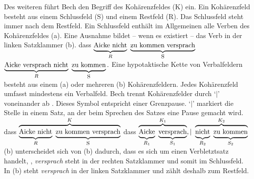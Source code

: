 Des weiteren führt Bech den Begriff des Kohärenzfeldes (K) ein.%
Ein Kohärenzfeld besteht aus einem Schlussfeld (S) und einem Restfeld (R).%
%
%
%
Das Schlussfeld steht immer nach dem Restfeld. Ein Schlussfeld enthält im Allgemeinen
alle Verben des Kohärenzfeldes (a). Eine Ausnahme bildet -- wenn es existiert --
das Verb in der linken Satzklammer (b).
\eal
\ex dass ${\underbrace{\rule[-0.5ex]{0cm}{2.5ex}\mbox{Aicke nicht}
                              }_{R}~
                   \underbrace{\mbox{zu kommen versprach}
                              }_{\mbox{\footnotesize S}}}$
\ex ${ \underbrace{\mbox{Aicke versprach nicht}
                        }_{R}~
             \underbrace{\rule[-0.5ex]{0cm}{2.5ex}\mbox{zu kommen}
                        }_{\mbox{\footnotesize S}}.}$
\zl
Eine hypotaktische Kette von Verbalfeldern besteht aus einem (a) oder mehreren
(b) Kohärenzfeldern. Jedes Kohärenzfeld umfasst mindestens ein Verbalfeld. Bech trennt
Kohärenzfelder durch `$|$'\is{$\vert$} voneinander ab \citep[\S 77]{Bech55a}. 
%
%
Dieses Symbol entspricht einer Grenzpause.
`$|$' markiert die Stelle in einem Satz, an der beim Sprechen des Satzes 
eine Pause gemacht wird.
\eal
\ex dass ${\overbrace{\underbrace{\rule[-0.5ex]{0cm}{2.5ex}{\textrm{Aicke~nicht}}
                                         }_{R}~
                   \underbrace{\textrm{zu~kommen~versprach}}_{\mbox{\footnotesize S}}}^{K}}$
%
\ex dass ${\overbrace{\underbrace{\rule[-0.5ex]{0cm}{2.5ex}{\textrm{Aicke}}
                                         }_{R_1}~
                              \underbrace{\textrm{versprach}}_{S_1}
                             }^{K_1}, |~
                   \overbrace{\underbrace{\rule[-0.5ex]{0cm}{2.5ex}{\textrm{nicht}}
                                         }_{R_2}~
                              \underbrace{\rule[-0.5ex]{0cm}{2.5ex}{\textrm{zu~kommen}}
                                         }_{S_2}
                             }^{K_2}}$
\zl
(b) unterscheidet sich von (b) dadurch, dass es sich um
einen Verbletztsatz handelt, \dash, \emph{versprach} steht in der rechten Satzklammer und somit im
Schlussfeld. In (b) steht \emph{versprach} in der linken Satzklammer und zählt deshalb zum
Restfeld. 

